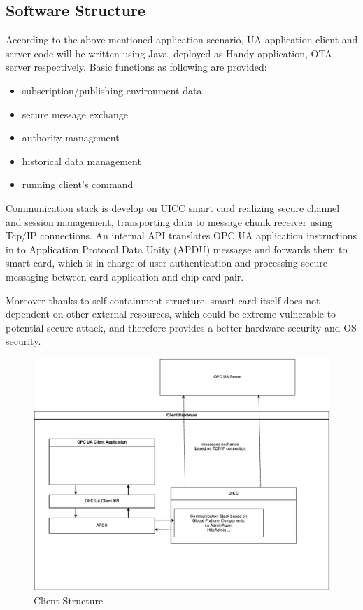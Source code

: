 \documentclass[]{llncs}
\begin{document}
\subsection {Software Structure}
According to the above-mentioned application scenario, UA application client and server code will be written using Java, deployed as Handy application, OTA server respectively. 
Basic functions as following are provided:
 \begin{itemize}
  \item subscription/publishing environment data
  \item secure message exchange
  \item authority management
  \item historical data management
  \item running client's command
\end{itemize}
Communication stack is develop on UICC smart card realizing secure channel and session management, transporting data to message chunk receiver using Tcp/IP connections. An internal API translates OPC UA application instructions in to Application Protocol Data Unity (APDU) messagse and forwards them to smart card, which is in charge of user authentication and processing secure messaging between card application and chip card pair. 


Moreover thanks to self-containment structure, smart card itself does not dependent on other external resources, which could be extreme vulnerable to potential secure attack, and therefore provides a better hardware security and OS security.

 \begin{figure}
	\centering
	\includegraphics[width=1.0\textwidth]{clientStructure}
		\caption[ ]{Client Structure}
	\label{fig:clientStructure}
\end{figure}
\end{document}
